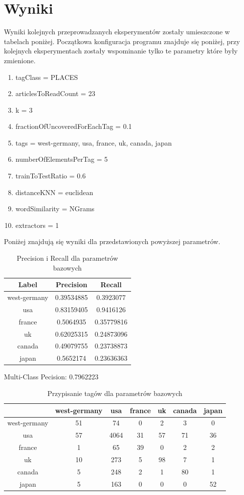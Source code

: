 \documentclass{classrep}
\begin{document}
\section{Wyniki}
Wyniki kolejnych przeprowadzanych eksperymentów zostały umieszczone w tabelach poniżej. Początkowa konfiguracja programu znajduje się poniżej, przy kolejnych eksperymentach zostały wspominanie tylko te parametry które były zmienione.
\begin{enumerate}
	\item tagClass = PLACES
	\item articlesToReadCount = 23
	\item k = 3
	\item fractionOfUncoveredForEachTag = 0.1
	\item tags = west-germany, usa, france, uk, canada, japan
	\item numberOfElementsPerTag = 5
	\item trainToTestRatio = 0.6
	\item distanceKNN = euclidean
	\item wordSimilarity = NGrams
	\item extractors = 1
\end{enumerate}
Poniżej znajdują się wyniki dla przedstawionych powyższej parametrów.
\begin{table}[H]
\begin{tabular}{|c|c|c|}
\hline
Label        & Precision  & Recall     \\ \hline
west-germany & 0.39534885 & 0.3923077  \\ \hline
usa          & 0.83159405 & 0.9416126  \\ \hline
france       & 0.5064935  & 0.35779816 \\ \hline
uk           & 0.62025315 & 0.24873096 \\ \hline
canada       & 0.49079755 & 0.23738873 \\ \hline
japan        & 0.5652174  & 0.23636363 \\ \hline
\end{tabular}
\caption{Precision i Recall dla parametrów bazowych}
\end{table}
Multi-Class Pecision: 0.7962223
\begin{table}[H]
\begin{tabular}{|c|c|c|c|c|c|c|}
\hline
             & west-germany & usa  & france & uk & canada & japan \\ \hline
west-germany & 51           & 74   & 0      & 2  & 3      & 0     \\ \hline
usa          & 57           & 4064 & 31     & 57 & 71     & 36    \\ \hline
france       & 1            & 65   & 39     & 0  & 2      & 2     \\ \hline
uk           & 10           & 273  & 5      & 98 & 7      & 1     \\ \hline
canada       & 5            & 248  & 2      & 1  & 80     & 1     \\ \hline
japan        & 5            & 163  & 0      & 0  & 0      & 52    \\ \hline
\end{tabular}
\caption{Przypisanie tagów dla parametrów bazowych}
\end{table}
\end{document}
